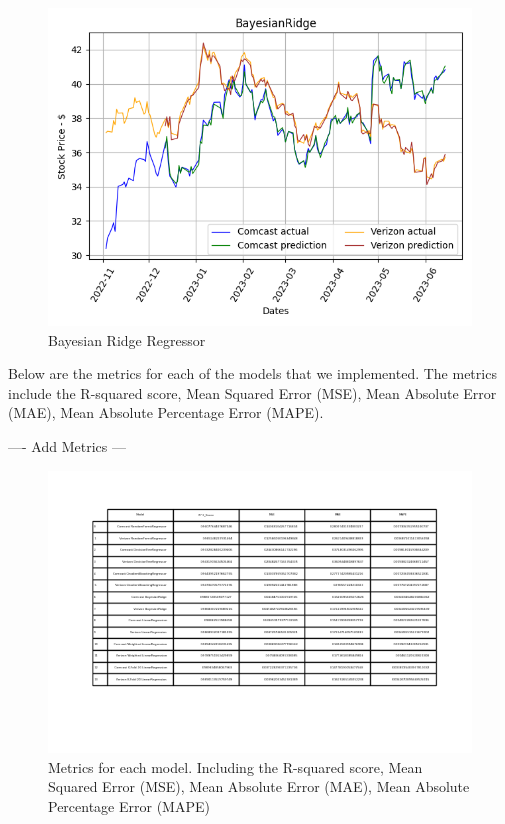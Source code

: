 \documentclass[conference]{IEEEtran}
\begin{document}
\begin{figure}
    \includegraphics[width=\columnwidth]{BayesianRidge}
    \caption{Bayesian Ridge Regressor}
\end{figure}

Below are the metrics for each of the models that we implemented.
The metrics include the R-squared score, Mean Squared Error (MSE), Mean Absolute Error (MAE), Mean Absolute Percentage Error (MAPE).

---- Add Metrics ---

\begin{figure}
    \includegraphics[width=\columnwidth]{metrics}
    \caption{Metrics for each model. Including the R-squared score, Mean Squared Error (MSE),
    Mean Absolute Error (MAE), Mean Absolute Percentage Error (MAPE)}
\end{figure}
\end{document}
